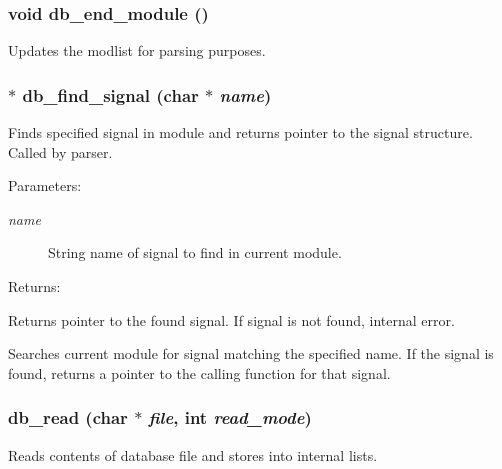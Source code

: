 \subsubsection{\setlength{\rightskip}{0pt plus 5cm}void db\_\-end\_\-module ()}\label{db_8c_a18}


Updates the modlist for parsing purposes. 
\subsubsection{$\ast$ db\_\-find\_\-signal (char $\ast$ {\em name})}\label{db_8c_a20}


Finds specified signal in module and returns pointer to the signal structure. Called by parser.

\begin{Desc}
\item[Parameters: ]\par
\begin{description}
\item[{\em 
name}]String name of signal to find in current module.\end{description}
\end{Desc}
\begin{Desc}
\item[Returns: ]\par
Returns pointer to the found signal. If signal is not found, internal error.\end{Desc}
Searches current module for signal matching the specified name. If the signal is found, returns a pointer to the calling function for that signal. 
\subsubsection{ db\_\-read (char $\ast$ {\em file}, int {\em read\_\-mode})}\label{db_8c_a15}


Reads contents of database file and stores into internal lists.


